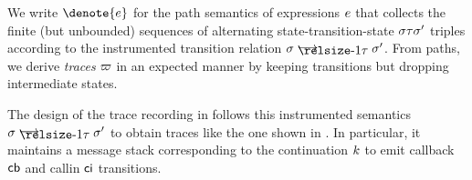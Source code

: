 \documentclass[10pt,reprint,nocopyrightspace,numbers]{sigplanconf}
\begin{document}

We write $\denote{\expr}$ for the path semantics of \semname{} expressions $e$ that collects the finite (but unbounded) sequences of alternating state-transition-state $\sigma\tau\sigma'$ triples according to the instrumented transition relation $\jstepins[\trans]{\state}{\state'}$.
From paths, we derive \emph{traces} $\varpi$ in an expected manner by keeping transitions but dropping intermediate states.

%

% 

The design of the trace recording in \toolname{} follows this instrumented semantics $\jstepins[\trans]{\state}{\state'}$ to obtain traces like the one shown in .
In particular, it maintains a message stack corresponding to the continuation $k$ to emit callback $\mathsf{cb}$ and callin $\mathsf{ci}$ transitions.

\end{document}
